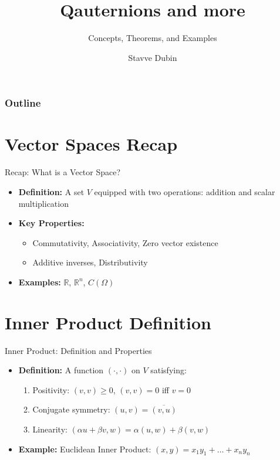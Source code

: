 \documentclass[
	aspectratio=169,    %
	onlytextwidth,        %
	t,                    %
]{beamer}
\title[Qauternions and more]{Qauternions and more}
\subtitle{Concepts, Theorems, and Examples}
\author[Stavve Dubin]{Stavve Dubin}
\begin{document}
\begin{frame}[plain]
    \titlepage
\end{frame}

\begin{frame}[plain]
    \frametitle{Outline}
    \tableofcontents
\end{frame}

\section{Vector Spaces Recap}
\begin{frame}{Recap: What is a Vector Space?}
    \begin{itemize}
        \item \textbf{Definition:} A set $V$ equipped with two operations: addition and scalar multiplication
        \item \textbf{Key Properties:}
        \begin{itemize}
            \item Commutativity, Associativity, Zero vector existence
            \item Additive inverses, Distributivity
        \end{itemize}
        \item \textbf{Examples:} $\mathbb{R}$, $\mathbb{R}^n$, $C(\Omega)$
    \end{itemize}
\end{frame}

\section{Inner Product Definition}
\begin{frame}{Inner Product: Definition and Properties}
    \begin{itemize}
        \item \textbf{Definition:} A function $(\cdot,\cdot)$ on $V$ satisfying:
        \begin{enumerate}
            \item Positivity: $(v,v) \geq 0$, $(v,v) = 0$ iff $v = 0$
            \item Conjugate symmetry: $(u,v) = \overline{(v,u)}$
            \item Linearity: $(\alpha u + \beta v, w) = \alpha (u,w) + \beta (v,w)$
        \end{enumerate}
        \item \textbf{Example:} Euclidean Inner Product: $(x,y) = x_1y_1 + \dots + x_ny_n$
    \end{itemize}
\end{frame}
\end{document}
